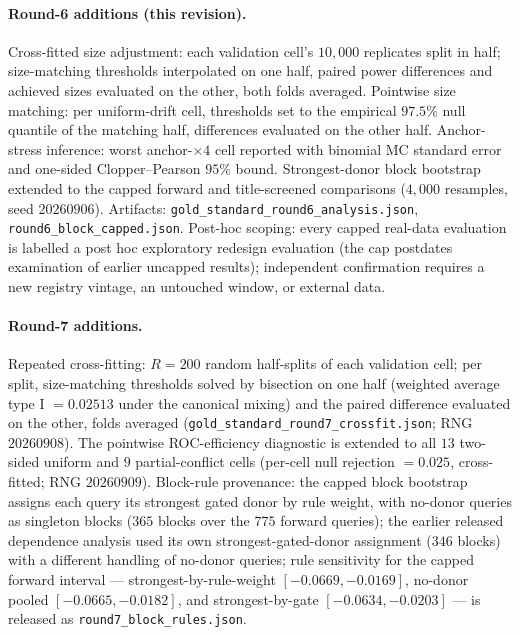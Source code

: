 \documentclass[11pt]{article}
\begin{document}
\paragraph{Round-6 additions (this revision).} Cross-fitted size
adjustment: each validation cell's $10{,}000$ replicates split in half;
size-matching thresholds interpolated on one half, paired power
differences and achieved sizes evaluated on the other, both folds
averaged. Pointwise size matching: per uniform-drift cell, thresholds set
to the empirical $97.5\%$ null quantile of the matching half, differences
evaluated on the other half. Anchor-stress inference: worst
anchor-$\times 4$ cell reported with binomial MC standard error and
one-sided Clopper--Pearson $95\%$ bound. Strongest-donor block bootstrap
extended to the capped forward and title-screened comparisons ($4{,}000$
resamples, seed $20260906$). Artifacts:
\texttt{gold\_standard\_\allowbreak round6\_analysis.json},
\texttt{round6\_block\_capped.json}. Post-hoc scoping: every capped
real-data evaluation is labelled a post hoc exploratory redesign
evaluation (the cap postdates examination of earlier uncapped results);
independent confirmation requires a new registry vintage, an untouched
window, or external data.

\paragraph{Round-7 additions.} Repeated cross-fitting:
$R = 200$ random half-splits of each validation cell; per split,
size-matching thresholds solved by bisection on one half (weighted
average type I $= 0.02513$ under the canonical mixing) and the paired
difference evaluated on the other, folds averaged
(\texttt{gold\_standard\_round7\_crossfit.json}; RNG $20260908$). The
pointwise ROC-efficiency diagnostic is extended to all $13$ two-sided
uniform and $9$ partial-conflict cells (per-cell null rejection $=
0.025$, cross-fitted; RNG $20260909$). Block-rule provenance: the capped
block bootstrap assigns each query its strongest gated donor by rule
weight, with no-donor queries as singleton blocks ($365$ blocks over the
$775$ forward queries); the earlier released dependence analysis used its
own strongest-gated-donor assignment ($346$ blocks) with a different
handling of no-donor queries; rule sensitivity for the capped forward
interval --- strongest-by-rule-weight $[-0.0669,-0.0169]$, no-donor
pooled $[-0.0665,-0.0182]$, and strongest-by-gate $[-0.0634,-0.0203]$
--- is released as \texttt{round7\_block\_rules.json}.
\end{document}
